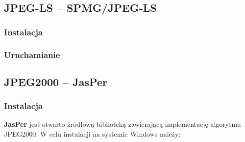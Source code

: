 \subsection{JPEG-LS -- SPMG/JPEG-LS}

\subsubsection{Instalacja}

\subsubsection{Uruchamianie}

\subsection{JPEG2000 -- JasPer}

\subsubsection{Instalacja}

\textbf{JasPer} jest otwarto źródłową biblioteką zawierającą implementację algorytmu JPEG2000. W celu instalacji na systemie Windows należy:

